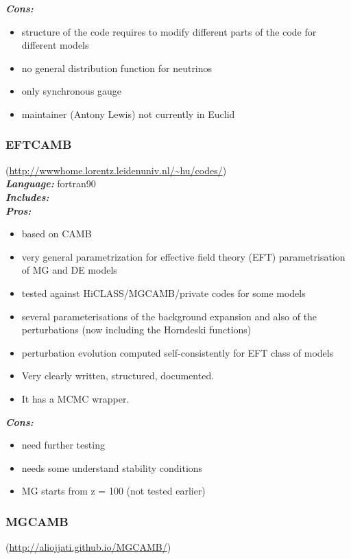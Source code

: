 {\it \bf Cons:}
\begin{itemize}
 \item structure of the code requires to modify different parts of the code for different models
 \item no general distribution function for neutrinos
 \item only synchronous gauge
 \item maintainer (Antony Lewis) not currently in Euclid
\end{itemize}

\newpage
\subsubsection{EFTCAMB}
(\url{http://wwwhome.lorentz.leidenuniv.nl/~hu/codes/})\\

{\it \bf Language:} fortran90\\

{\it \bf Includes:}\\

{\it \bf Pros:}
\begin{itemize}
 \item based on CAMB
 \item very general parametrization for effective field theory (EFT) parametrisation of MG and DE models
 \item tested against HiCLASS/MGCAMB/private codes for some models
 \item several parameterisations of the background expansion and also of the perturbations (now including the Horndeski functions)
 \item perturbation evolution computed self-consistently for EFT class of models
 \item Very clearly written, structured, documented. 
 \item It has a MCMC wrapper.
\end{itemize}

{\it \bf Cons: }
\begin{itemize}
 \item need further testing
 \item needs some understand stability conditions
 \item MG starts from z = 100 (not tested earlier)
\end{itemize}

\newpage
\subsubsection{MGCAMB}(\url{http://aliojjati.github.io/MGCAMB/})\\

